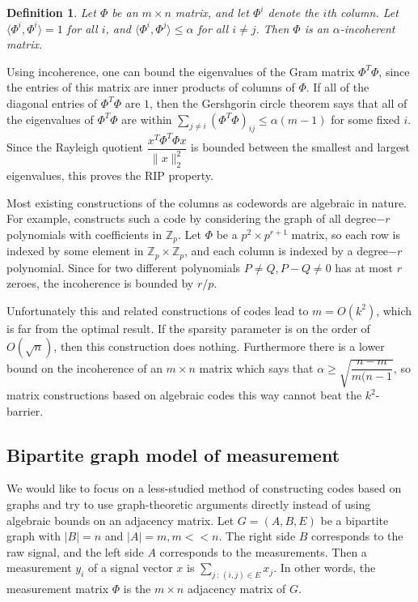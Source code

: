 \documentclass[english]{article}
\theoremstyle{plain}
\newtheorem{definition}{Definition}
\begin{document}
\begin{definition}
Let $\Phi$ be an $m\times n$ matrix, and let $\Phi^i$ denote the $i$th column. Let $\langle \Phi^i,\Phi^i \rangle = 1$ for all $i$, and $\langle \Phi^i, \Phi^j \rangle \le \alpha$ for all $i\neq j$. Then $\Phi$ is an $\alpha$-incoherent matrix.
\end{definition}

Using incoherence, one can bound the eigenvalues of the Gram matrix $\Phi^T\Phi$, since the entries of this matrix are inner products of columns of $\Phi$. If all of the diagonal entries of $\Phi^T \Phi$ are $1$, then the Gershgorin circle theorem says that all of the eigenvalues of $\Phi^T\Phi$ are within $\sum_{j\neq i} (\Phi^T\Phi)_{ij} \le \alpha(m-1)$ for some fixed $i$. Since the Rayleigh quotient $\dfrac{x^T\Phi^T\Phi x}{\|x\|_2^2}$ is bounded between the smallest and largest eigenvalues, this proves the RIP property. 

Most existing constructions of the columns as codewords are algebraic in nature. For example, \cite{DeVore07} constructs such a code by considering the graph of all degree$-r$ polynomials with coefficients in $\mathbb{Z}_p$. Let $\Phi$ be a $p^2 \times p^{r+1}$ matrix, so each row is indexed by some element in $\mathbb{Z}_p \times \mathbb{Z}_p$, and each column is indexed by a degree$-r$ polynomial. Since for two different polynomials $P \neq Q, P-Q\neq 0$ has at most $r$ zeroes, the incoherence is bounded by $r/p$. 

Unfortunately this and related constructions of codes lead to $m = O(k^2)$, which is far from the optimal result. If the sparsity parameter is on the order of $O(\sqrt{n})$, then this construction does nothing. Furthermore there is a lower bound on the incoherence of an $m\times n$ matrix which says that $\alpha \ge \sqrt{\dfrac{n-m}{m(n-1}}$, so matrix constructions based on algebraic codes this way cannot beat the $k^2$-barrier. 

\subsection{Bipartite graph model of measurement}

We would like to focus on a less-studied method of constructing codes based on graphs and try to use graph-theoretic arguments directly instead of using algebraic bounds on an adjacency matrix. Let $G = (A,B,E)$ be a bipartite graph with $|B| = n$ and $|A| = m, m << n$. The right side $B$ corresponds to the raw signal, and the left side $A$ corresponds to the measurements. Then a measurement $y_i$ of a signal vector $x$ is $\displaystyle\sum_{j \, : \, (i,j)\in E} x_j$. In other words, the measurement matrix $\Phi$ is the $m\times n$ adjacency matrix of $G$. 
\end{document}
